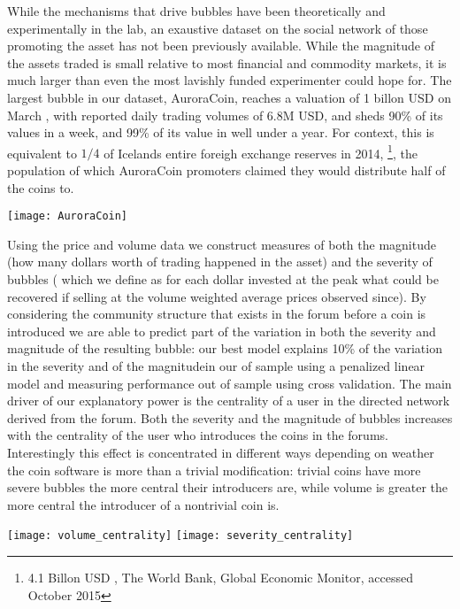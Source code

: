 While the mechanisms that drive bubbles have been theoretically  \cite{abolafia1988enacting, earl2007decision, bakker2010social, harras2011grow} and experimentally \cite{moinas2013bubble} in the lab, an exaustive dataset on the social network of those promoting the asset has not been previously available.
While the magnitude of the assets traded is small relative to most financial and commodity markets, it is much larger than even the most lavishly funded experimenter could hope for.
The largest bubble in our dataset, AuroraCoin, reaches a valuation of 1 billon USD on March , with reported daily trading volumes of 6.8M USD, and sheds 90\% of its values in a week, and 99\% of its value in well under a year.
For context, this is equivalent to $1/4$ of Icelands entire foreigh exchange reserves in 2014, \footnote{4.1 Billon USD , The World Bank, Global Economic Monitor, accessed October 2015}, the population of which AuroraCoin promoters claimed they would distribute half of the coins to.

\begin{figure*}
\texttt{[image: AuroraCoin]}
\end{figure*}

Using the price and volume data we construct measures of both  the magnitude (how many dollars worth of trading happened in the asset) and the severity of bubbles ( which we define as for each dollar invested at the peak what could be recovered if selling at the volume weighted average prices observed since).
By considering the community structure that exists in the forum before a coin is introduced we are able to predict part of the variation in both the severity and magnitude of the resulting bubble: our best model explains 10\% of the variation in the severity and of the magnitudein our of sample using a penalized linear model and measuring performance out of sample using cross validation. 
The main driver of our explanatory power is the centrality of a user in the directed network derived from the forum.
Both the severity and the magnitude of bubbles increases with the centrality of the user who introduces the coins in the forums.
Interestingly this effect is concentrated in different ways depending on weather the coin software is more than a trivial modification: trivial coins have more severe bubbles the more central their introducers are, while volume is greater the more central the introducer of a nontrivial coin is.


\begin{figure*}
\texttt{[image: volume\_centrality]}
\texttt{[image: severity\_centrality]}
\end{figure*}

